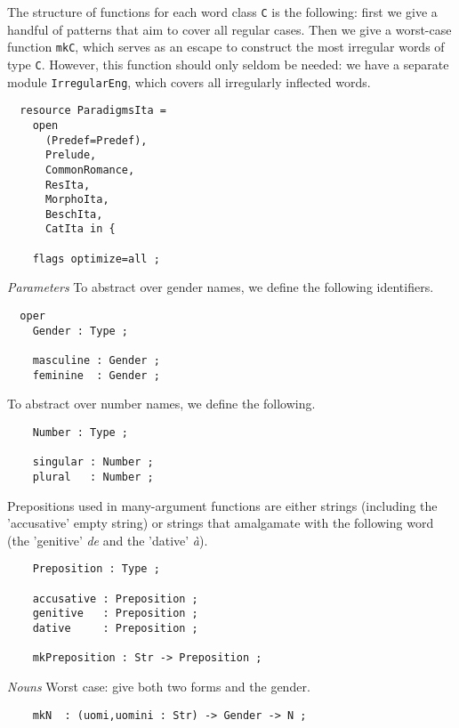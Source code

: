 \documentclass[11pt,a4paper]{article}
\newcommand{\subsubsubsection}[1]{\textit{#1}}
\begin{document}
The structure of functions for each word class \texttt{C} is the following:
first we give a handful of patterns that aim to cover all
regular cases. Then we give a worst-case function \texttt{mkC}, which serves as an
escape to construct the most irregular words of type \texttt{C}.
However, this function should only seldom be needed: we have a
separate module \texttt{IrregularEng}, which covers all irregularly inflected
words.

\begin{verbatim}
  resource ParadigmsIta = 
    open 
      (Predef=Predef), 
      Prelude, 
      CommonRomance, 
      ResIta, 
      MorphoIta, 
      BeschIta,
      CatIta in {
  
    flags optimize=all ;
\end{verbatim}

\subsubsubsection{Parameters}
To abstract over gender names, we define the following identifiers.

\begin{verbatim}
  oper
    Gender : Type ; 
  
    masculine : Gender ;
    feminine  : Gender ;
\end{verbatim}

To abstract over number names, we define the following.

\begin{verbatim}
    Number : Type ; 
  
    singular : Number ;
    plural   : Number ;
\end{verbatim}

Prepositions used in many-argument functions are either strings
(including the 'accusative' empty string) or strings that
amalgamate with the following word (the 'genitive' \textit{de} and the
'dative' \textit{à}).

\begin{verbatim}
    Preposition : Type ;
  
    accusative : Preposition ;
    genitive   : Preposition ;
    dative     : Preposition ;
  
    mkPreposition : Str -> Preposition ;
\end{verbatim}

\subsubsubsection{Nouns}
Worst case: give both two forms and the gender. 

\begin{verbatim}
    mkN  : (uomi,uomini : Str) -> Gender -> N ;
\end{verbatim}
\end{document}
